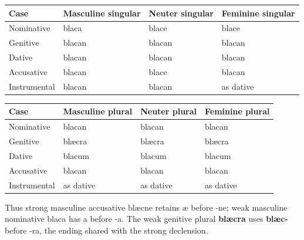 \par\begingroup
\fontsize{10.5}{13.2}\selectfont
\setlength{\LTleft}{0pt}\setlength{\LTright}{\fill}
\noindent
\begin{tabular}{@{}>{\raggedright\arraybackslash}p{22.0mm}>{\raggedright\arraybackslash}p{31.188mm}>{\raggedright\arraybackslash}p{31.188mm}>{\raggedright\arraybackslash}p{31.188mm}@{}}
\toprule
\textbf{Case} & \textbf{Masculine singular} & \textbf{Neuter singular} & \textbf{Feminine singular} \\
\midrule
Nominative & blaca & blace & blace \\
Genitive & blacan & blacan & blacan \\
Dative & blacan & blacan & blacan \\
Accusative & blacan & blace & blacan \\
Instrumental & blacan & blacan & as dative \\
\bottomrule
\end{tabular}
\par\endgroup
\par\addvspace{5pt}
\par\begingroup
\fontsize{10.5}{13.2}\selectfont
\setlength{\LTleft}{0pt}\setlength{\LTright}{\fill}
\noindent
\begin{tabular}{@{}>{\raggedright\arraybackslash}p{22.0mm}>{\raggedright\arraybackslash}p{31.188mm}>{\raggedright\arraybackslash}p{31.188mm}>{\raggedright\arraybackslash}p{31.188mm}@{}}
\toprule
\textbf{Case} & \textbf{Masculine plural} & \textbf{Neuter plural} & \textbf{Feminine plural} \\
\midrule
Nominative & blacan & blacan & blacan \\
Genitive & blæcra & blæcra & blæcra \\
Dative & blacum & blacum & blacum \\
Accusative & blacan & blacan & blacan \\
Instrumental & as dative & as dative & as dative \\
\bottomrule
\end{tabular}
\par\endgroup

Thus strong masculine accusative blæcne retains æ before -ne; weak masculine nominative blaca has a before -a. The weak genitive plural \textbf{blæcra} uses \textbf{blæc-} before -ra, the ending shared with the strong declension.

